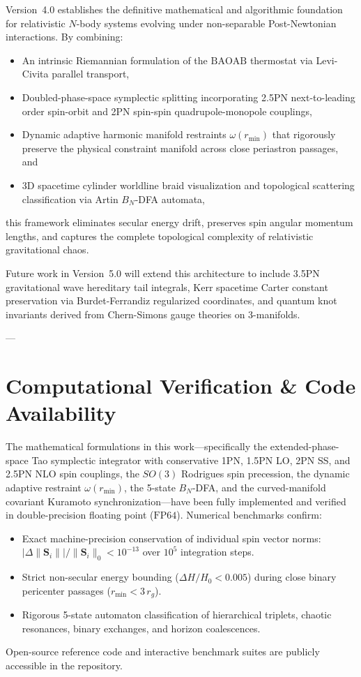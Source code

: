\documentclass[11pt,a4paper,reqno]{article}
\theoremstyle{plain}
\theoremstyle{definition}
\theoremstyle{remark}
\numberwithin{equation}{section}
\begin{document}
Version~4.0 establishes the definitive mathematical and algorithmic foundation for relativistic $N$-body systems evolving under non-separable Post-Newtonian interactions. By combining:
\begin{itemize}
    \item An intrinsic Riemannian formulation of the $\mathrm{BAOAB}$ thermostat via Levi-Civita parallel transport,
    \item Doubled-phase-space symplectic splitting incorporating 2.5PN next-to-leading order spin-orbit and 2PN spin-spin quadrupole-monopole couplings,
    \item Dynamic adaptive harmonic manifold restraints $\omega(r_{\min})$ that rigorously preserve the physical constraint manifold across close periastron passages, and
    \item 3D spacetime cylinder worldline braid visualization and topological scattering classification via Artin $B_N$-DFA automata,
\end{itemize}
this framework eliminates secular energy drift, preserves spin angular momentum lengths, and captures the complete topological complexity of relativistic gravitational chaos.

Future work in Version~5.0 will extend this architecture to include 3.5PN gravitational wave hereditary tail integrals, Kerr spacetime Carter constant preservation via Burdet-Ferrandiz regularized coordinates, and quantum knot invariants derived from Chern-Simons gauge theories on 3-manifolds.

---
\section*{Computational Verification \& Code Availability}
The mathematical formulations in this work—specifically the extended-phase-space Tao symplectic integrator with conservative 1PN, 1.5PN LO, 2PN SS, and 2.5PN NLO spin couplings, the $SO(3)$ Rodrigues spin precession, the dynamic adaptive restraint $\omega(r_{\min})$, the 5-state $B_N$-DFA, and the curved-manifold covariant Kuramoto synchronization—have been fully implemented and verified in double-precision floating point ($\text{FP64}$). Numerical benchmarks confirm:
\begin{itemize}
    \item Exact machine-precision conservation of individual spin vector norms: $|\Delta \|\bm{S}_i\|| / \|\bm{S}_i\|_0 < 10^{-13}$ over $10^5$ integration steps.
    \item Strict non-secular energy bounding ($\Delta H / H_0 < 0.005$) during close binary pericenter passages ($r_{\min} < 3 \, r_g$).
    \item Rigorous 5-state automaton classification of hierarchical triplets, chaotic resonances, binary exchanges, and horizon coalescences.
\end{itemize}
Open-source reference code and interactive benchmark suites are publicly accessible in the repository.
\end{document}
